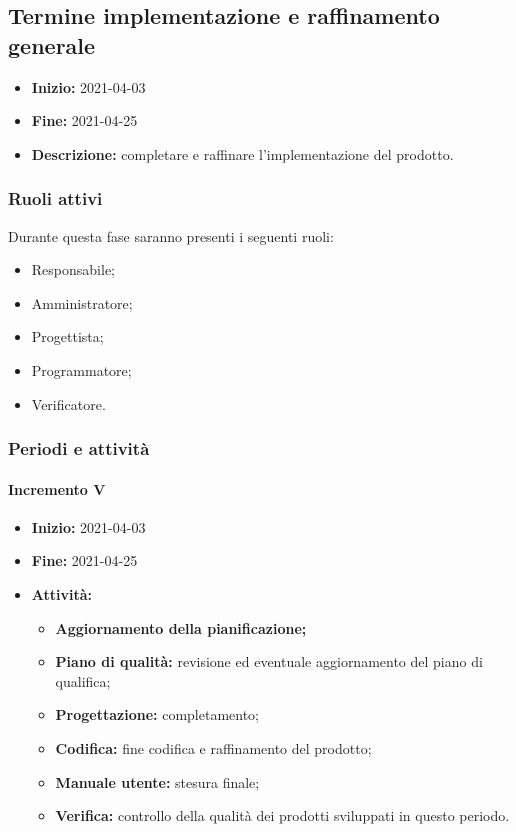 

\subsection{Termine implementazione e raffinamento generale} \label{_pianificazioneTermineImplementazione}
\begin{itemize}
    \item [] \textbf{Inizio:} 2021-04-03
    \item [] \textbf{Fine:} 2021-04-25
    \item [] \textbf{Descrizione:} completare e raffinare l'implementazione del prodotto.
\end{itemize}

\subsubsection{Ruoli attivi}
Durante questa fase saranno presenti i seguenti ruoli:
\begin{itemize}
    \item Responsabile;
    \item Amministratore;
    \item Progettista;
    \item Programmatore;
    \item Verificatore.
\end{itemize}

\subsubsection{Periodi e attività}

\paragraph[Incremento V]{Incremento V}
\begin{itemize}
    \item [] \textbf{Inizio:} 2021-04-03
    \item [] \textbf{Fine:} 2021-04-25
    \item [] \textbf{Attività:}
          \begin{itemize}
              \item \textbf{Aggiornamento della pianificazione;}
              \item \textbf{Piano di qualità:} revisione ed eventuale aggiornamento del piano di qualifica;
              \item \textbf{Progettazione:} completamento;
              \item \textbf{Codifica:} fine codifica e raffinamento del prodotto;
              \item \textbf{Manuale utente:} stesura finale;
              \item \textbf{Verifica:} controllo della qualità dei prodotti sviluppati in questo periodo.
          \end{itemize}
\end{itemize}

